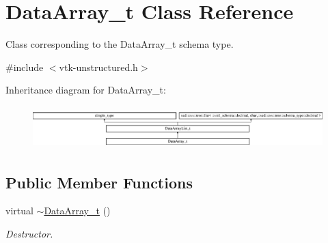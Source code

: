 \hypertarget{classDataArray__t}{\section{Data\-Array\-\_\-t Class Reference}
\label{classDataArray__t}
}


Class corresponding to the Data\-Array\-\_\-t schema type.  




{\ttfamily \#include $<$vtk-\/unstructured.\-h$>$}

Inheritance diagram for Data\-Array\-\_\-t\-:\begin{figure}[H]
\begin{center}
\leavevmode
\includegraphics[height=1.660079cm]{classDataArray__t}
\end{center}
\end{figure}
\subsection*{Public Member Functions}
\begin{DoxyCompactItemize}
\item 
virtual \hyperlink{classDataArray__t_ac9806a5eedf7abecd7adf6408c8af894}{$\sim$\-Data\-Array\-\_\-t} ()
\begin{DoxyCompactList}\small\item\em Destructor. \end{DoxyCompactList}\end{DoxyCompactItemize}
